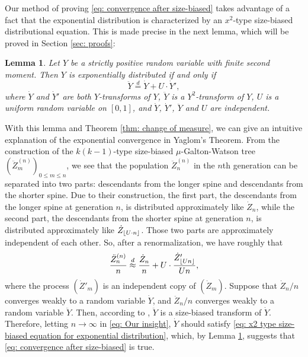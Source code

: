 \documentclass[12pt,a4paper]{amsart}
\DeclarePairedDelimiter\floor{\lfloor}{\rfloor}
\newtheorem{lem}[thm]{Lemma}
\numberwithin{equation}{section}
\begin{document}
	Our method of proving
	\eqref{eq: convergence after size-biased}
	takes advantage of a fact that the exponential distribution is characterized by an $x^2$-type size-biased distributional equation.
	This is made precise in the next lemma, which will be proved in Section \ref{sec: proofs}:
\begin{lem} \label{lem: our equation}
	Let $Y$ be a strictly positive random variable with finite second moment.
	Then $Y$ is exponentially distributed if and only if
\begin{equation}
\label{eq: x2 type size-biased equation for exponential distribution}
	\ddot Y \overset{d}
	= \dot Y + U \cdot \dot Y',
\end{equation}
 where $\dot Y$ and $\dot Y'$ are both $Y$-transforms of  $Y$,
$\ddot Y$ is a $Y^2$-transform of $Y$,
	$U$ is a uniform random variable on $[0,1]$, and $\dot Y$, $\dot Y'$, $\ddot Y$
	and $U$ are independent.
\end{lem}	
	With this lemma and Theorem \ref{thm: change of measure}, we can give an intuitive explanation of the exponential convergence in Yaglom's Theorem.
	From the construction of the $k(k-1)$-type size-biased $\mu$-Galton-Watson tree $(\ddot Z^{(n)}_m)_{0\le m\le n}$, we see that the population $\ddot Z^{(n)}_n$ in the $n$th generation can be separated into two parts: descendants
	from the longer spine and descendants from the shorter spine.
	Due to their construction,
	the first part, the descendants from the longer spine at generation $n$,
	is distributed approximately like $\dot Z_n$,
	while the second part, the descendants from the shorter spine at generation $n$, is distributed approximately like $\dot Z_{ \floor{U\cdot n}}$.
	Those two parts are approximately independent of each other.
	So, after a renormalization, we have roughly that
\begin{equation}
\label{eq: Our insight}
	\frac{\ddot Z_n^{(n)}}{n}
	\overset{d} \approx \frac{\dot Z_n}{n} +
	U \cdot \frac{   \dot Z'_{  \floor{ U n }  }   }    {   Un   },
\end{equation}
	where the process $(\dot Z'_m)$ is an independent copy of $(\dot Z_m)$.
	Suppose that $\dot Z_n/n$ converges weakly to a random variable $\dot Y$, and $\ddot Z_n/n$ converges weakly to a random variable $\ddot Y$. 
	Then, according to \cite[Lemma 4.3]{lyons1995conceptual}, $\ddot Y$ is a size-biased transform of $\dot Y$. 
Therefore, letting $n\to\infty$ in \eqref{eq: Our insight}, 
	$\dot Y$ should satisfy \eqref{eq: x2 type size-biased equation for exponential distribution}, which, by Lemma \ref{lem: our equation}, suggests that \eqref{eq: convergence after size-biased} is true.
	
\end{document}
